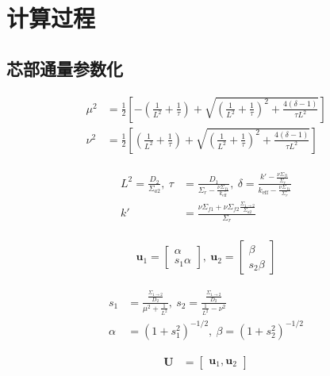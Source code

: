 \section{计算过程}
\label{sec:calculation}

\subsection{芯部通量参数化}

\begin{align}
    \mu^2 &= \frac{1}{2}\left[-\left(\frac{1}{L^2}+\frac{1}{\tau}\right)+\sqrt{\left(\frac{1}{L^2}+\frac{1}{\tau}\right)^2+\frac{4(\delta-1)}{\tau L^2}}\right] \\
    \nu^2 &= \frac{1}{2}\left[\left(\frac{1}{L^2}+\frac{1}{\tau}\right)+\sqrt{\left(\frac{1}{L^2}+\frac{1}{\tau}\right)^2+\frac{4(\delta-1)}{\tau L^2}}\right]
\end{align}

\begin{align}
    \begin{split}
        L^2 = \frac{D_2}{\Sigma_{a2}},\ \tau &= \frac{D_1}{\Sigma_r - \frac{\nu\Sigma_{f1}}{k_\mathrm{eff}}},\ \delta = \frac{k'-\frac{\nu\Sigma_{f1}}{\Sigma_r}}{k_\mathrm{eff}-\frac{\nu\Sigma_{f1}}{\Sigma_r}} \\
        k' &= \frac{\nu\Sigma_{f1}+\nu\Sigma_{f2}\frac{\Sigma_{1\rightarrow 2}}{\Sigma_{a2}}}{\Sigma_r}
    \end{split}
\end{align}

\begin{align}
    \pmb{u}_1 = \begin{bmatrix}
        \alpha \\
        s_1\alpha
    \end{bmatrix},\ 
    \pmb{u}_2 = \begin{bmatrix}
        \beta \\
        s_2\beta
    \end{bmatrix}
\end{align}

\begin{align}
    s_1 &= \frac{\frac{\Sigma_{1\rightarrow 2}}{D_2}}{\mu^2 + \frac{1}{L^2}},\ s_2 = \frac{\frac{\Sigma_{1\rightarrow 2}}{D_2}}{\frac{1}{L^2}-\nu^2} \\
    \alpha &= \left(1+s_1^2\right)^{-1/2},\ \beta = \left(1+s_2^2\right)^{-1/2}
\end{align}

\begin{align}
    \pmb{U} &= \begin{bmatrix}
        \pmb{u}_1, \pmb{u}_2
    \end{bmatrix}
\end{align}


